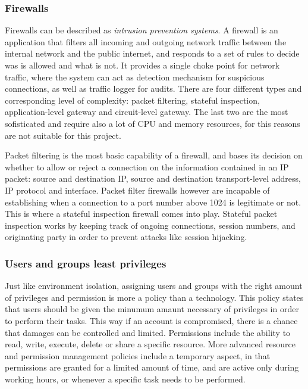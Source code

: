 \subsubsection{Firewalls}
Firewalls can be described as \emph{intrusion prevention systems}. A firewall is
an application that filters all incoming and outgoing network traffic between
the internal network and the public internet, and responds to a set of rules to
decide was is allowed and what is not. It provides a single choke point
for network traffic, where the system can act as detection mechanism for
suspicious connections, as well as traffic logger for audits. There are four
different types and corresponding level of complexity: packet filtering,
stateful inspection, application-level gateway and circuit-level gateway. The
last two are the most sofisticated and require also a lot of CPU and memory
resources, for this reasons are not suitable for this project.

Packet filtering is the most basic capability of a firewall, and bases its
decision on whether to allow or reject a connection on the information contained in an IP
packet: source and destination IP, source and destination transport-level
address, IP protocol and interface. Packet filter firewalls however are
incapable of establishing when a connection to a port number above 1024 is
legitimate or not. This is where a stateful inspection firewall comes into play.
Stateful packet inspection works by keeping track of ongoing connections,
session numbers, and originating party in order to prevent attacks like session
hijacking.

\subsubsection{Users and groups least privileges}
Just like environment isolation, assigning users and groups with the right
amount of privileges and permission is more a policy than a technology. This
policy states that users should be given the minumum amaunt necessary of
privileges in order to perform their tasks. This way if an account is
compromised, there is a chance that damages can be controlled and limited.
Permissions include the ability to read, write, execute, delete or share a
specific resource. More advanced resource and permission management policies
include a temporary aspect, in that permissions are granted for a limited amount
of time, and are active only during working hours, or whenever a specific task
needs to be performed.

